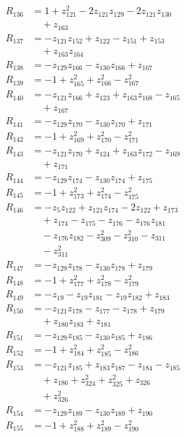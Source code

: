 \begin{align*}
R_{136} &= 1 +z_{121}^{2} -2z_{121}z_{129} -2z_{121}z_{130} \\
&\quad +z_{163} \\
R_{137} &= -z_{121}z_{152} +z_{122} -z_{151} +z_{153} \\
&\quad +z_{163}z_{164} \\
R_{138} &= -z_{129}z_{166} -z_{130}z_{166} +z_{167} \\
R_{139} &= -1 +z_{165}^{2} +z_{166}^{2} -z_{167}^{2} \\
R_{140} &= -z_{121}z_{166} +z_{123} +z_{163}z_{168} -z_{165} \\
&\quad +z_{167} \\
R_{141} &= -z_{129}z_{170} -z_{130}z_{170} +z_{171} \\
R_{142} &= -1 +z_{169}^{2} +z_{170}^{2} -z_{171}^{2} \\
R_{143} &= -z_{121}z_{170} +z_{124} +z_{163}z_{172} -z_{169} \\
&\quad +z_{171} \\
R_{144} &= -z_{129}z_{174} -z_{130}z_{174} +z_{175} \\
R_{145} &= -1 +z_{173}^{2} +z_{174}^{2} -z_{175}^{2} \\
R_{146} &= -z_{5}z_{122} +z_{121}z_{174} -2z_{122} +z_{173} \\
&\quad +z_{174} -z_{175} -z_{176} -z_{176}z_{181} \\
&\quad -z_{176}z_{182} -z_{309}^{2} -z_{310}^{2} -z_{311} \\
&\quad -z_{311}^{2} \\
R_{147} &= -z_{129}z_{178} -z_{130}z_{178} +z_{179} \\
R_{148} &= -1 +z_{177}^{2} +z_{178}^{2} -z_{179}^{2} \\
R_{149} &= -z_{19} -z_{19}z_{181} -z_{19}z_{182} +z_{183} \\
R_{150} &= -z_{121}z_{178} -z_{177} -z_{178} +z_{179} \\
&\quad +z_{180}z_{183} +z_{181} \\
R_{151} &= -z_{129}z_{185} -z_{130}z_{185} +z_{186} \\
R_{152} &= -1 +z_{184}^{2} +z_{185}^{2} -z_{186}^{2} \\
R_{153} &= -z_{121}z_{185} +z_{183}z_{187} -z_{184} -z_{185} \\
&\quad +z_{186} +z_{324}^{2} +z_{325}^{2} +z_{326} \\
&\quad +z_{326}^{2} \\
R_{154} &= -z_{129}z_{189} -z_{130}z_{189} +z_{190} \\
R_{155} &= -1 +z_{188}^{2} +z_{189}^{2} -z_{190}^{2} \\

\end{align*}
